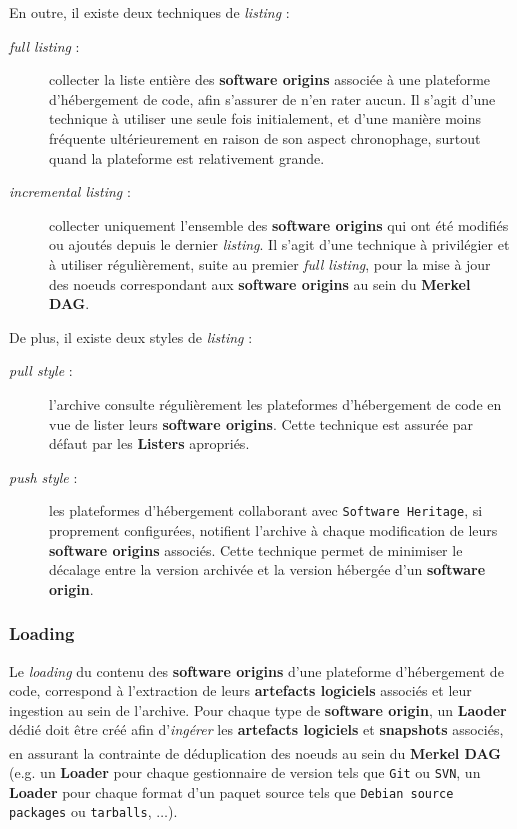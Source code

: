 \documentclass[12pt,a4paper]{report}
\theoremstyle{definition}
\begin{document}
En outre, il existe deux techniques de \textit{listing} :
\begin{description}
	\item [\textit{full listing} :] collecter la liste entière des \textbf{software origins} associée à une plateforme d'hébergement de code, afin s'assurer de n'en rater aucun. Il s'agit d'une technique à utiliser une seule fois initialement, et d'une manière moins fréquente ultérieurement en raison de son aspect chronophage, surtout quand la plateforme est relativement grande.
	\item [\textit{incremental listing} :] collecter uniquement l'ensemble des \textbf{software origins} qui ont été modifiés ou ajoutés depuis le dernier \textit{listing}. Il s'agit d'une technique à privilégier et à utiliser régulièrement, suite au premier \textit{full listing}, pour la mise à jour des noeuds correspondant aux \textbf{software origins} au sein du \textbf{Merkel DAG}.
\end{description}

De plus, il existe deux styles de \textit{listing} :
\begin{description}
	\item [\textit{pull style} :] l'archive consulte régulièrement les plateformes d'hébergement de code en vue de lister leurs \textbf{software origins}. Cette technique est assurée par défaut par les \textbf{Listers} apropriés.
	\item [\textit{push style} :] les plateformes d'hébergement collaborant avec \texttt{Software Heritage}, si proprement configurées, notifient l'archive à chaque modification de leurs \textbf{software origins} associés. Cette technique permet de minimiser le décalage entre la version archivée et la version hébergée d'un \textbf{software origin}.
\end{description}

\subsubsection{Loading}
Le \textit{loading} du contenu des \textbf{software origins} d'une plateforme d'hébergement de code, correspond à l'extraction de leurs \textbf{artefacts logiciels} associés et leur ingestion au sein de l'archive. Pour chaque type de \textbf{software origin}, un \textbf{Laoder} dédié doit être créé afin d'\og \textit{ingérer} \fg les \textbf{artefacts logiciels} et \textbf{snapshots} associés, en assurant la contrainte de déduplication des noeuds au sein du \textbf{Merkel DAG}\textsuperscript{\citep{dicosmoWhyAndHow}} (e.g. un \textbf{Loader} pour chaque gestionnaire de version tels que \texttt{Git} ou \texttt{SVN}, un \textbf{Loader} pour chaque format d'un paquet source tels que \texttt{Debian source packages} ou \texttt{tarballs}, $\dots$).
\end{document}
